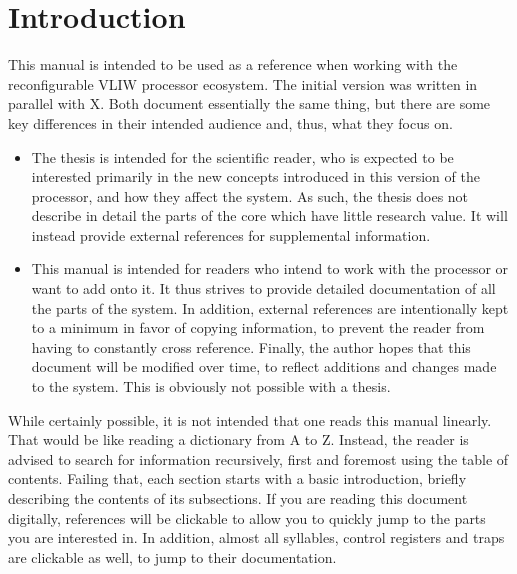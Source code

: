 
\chapter{Introduction}
\label{sec:introduction}

This manual is intended to be used as a reference when working with the \rvex{} 
reconfigurable VLIW processor ecosystem. The initial version was written in 
parallel with X. Both 
document essentially the same thing, but there are some key differences in their 
intended audience and, thus, what they focus on.

\begin{itemize}

\item The thesis is intended for the scientific reader, who is expected to be
interested primarily in the new concepts introduced in this version of the
\rvex{} processor, and how they affect the system. As such, the thesis does not
describe in detail the parts of the \rvex{} core which have little research
value. It will instead provide external references for supplemental information.

\item This manual is intended for readers who intend to work with the \rvex{} 
processor or want to add onto it. It thus strives to provide detailed 
documentation of all the parts of the system. In addition, external references 
are intentionally kept to a minimum in favor of copying information, to prevent 
the reader from having to constantly cross reference. Finally, the author hopes 
that this document will be modified over time, to reflect additions and changes 
made to the system. This is obviously not possible with a thesis.

\end{itemize}

\noindent While certainly possible, it is not intended that one reads this 
manual linearly. That would be like reading a dictionary from A to Z. Instead,
the reader is advised to search for information recursively, first and foremost
using the table of contents. Failing that, each section starts with a basic
introduction, briefly describing the contents of its subsections. If you are
reading this document digitally, references will be clickable to allow you to
quickly jump to the parts you are interested in. In addition, almost all
syllables, control registers and traps are clickable as well, to jump to their
documentation.

